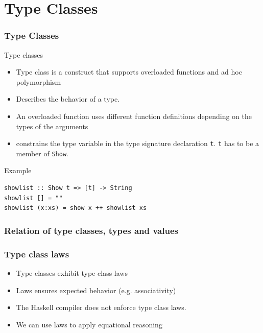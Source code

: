 \documentclass{beamer}
\begin{document}
\section{Type Classes}

\begin{frame}[fragile]
\frametitle{Type Classes}
  \begin{block}{Type classes}
    \begin{itemize}
    \item  Type class is a construct that supports overloaded functions and ad hoc polymorphism
    \item Describes the behavior of a type.
  \item An overloaded function uses different function definitions depending on the types of the arguments
  \item constrains the type variable in the type signature declaration \verb|t|. \verb|t| has to be a member of \verb|Show|.
  \end{itemize}
\end{block}
\begin{block}{Example}
\begin{Verbatim}
showlist :: Show t => [t] -> String
showlist [] = ""
showlist (x:xs) = show x ++ showlist xs
\end{Verbatim}

\end{block}
\end{frame}

\begin{frame}
\frametitle{Relation of type classes, types and values}


\end{frame}

\begin{frame}
\frametitle{Type class laws}
  \begin{itemize}
\item Type classes exhibit type class laws
\item Laws ensures expected behavior (e.g. associativity)
\item The Haskell compiler does not enforce type class laws.
\item We can use laws to apply equational reasoning
\end{itemize}  
\end{frame}
\end{document}

